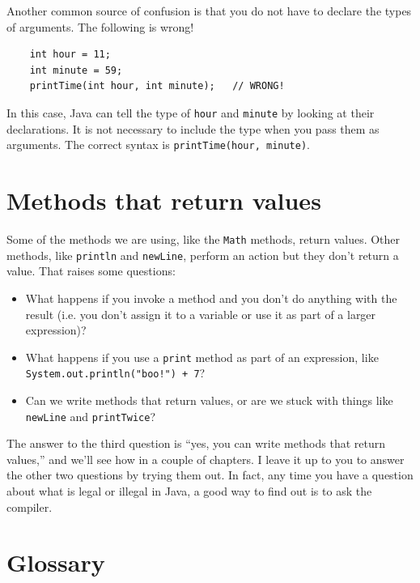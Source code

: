 \documentclass[12pt]{book}
\theoremstyle{exercise}
\begin{document}
Another common source of confusion is that you do not have
to declare the types of arguments.  The following is wrong!

\begin{lstlisting}
    int hour = 11;
    int minute = 59;
    printTime(int hour, int minute);   // WRONG!
\end{lstlisting}
%
In this case, Java can tell the type of {\tt hour}
and {\tt minute} by looking at their declarations.  It is
not necessary to include the type when you pass them
as arguments.  The correct
syntax is {\tt printTime(hour, minute)}.


\section {Methods that return values}

Some of the methods we are using,
like the {\tt Math} methods, return values.  Other methods,
like {\tt println} and {\tt newLine}, perform an action but
they don't return a value.  That raises some questions:

\begin{itemize}

\item What happens if you invoke a method and you don't
do anything with the result (i.e. you don't assign it to
a variable or use it as part of a larger expression)?

\item What happens if you use a {\tt print} method as part
of an expression, like {\tt System.out.println("boo!") + 7}?

\item Can we write methods that return values, or are we
stuck with things like {\tt newLine} and {\tt printTwice}?

\end{itemize}

The answer to the third question is ``yes, you can write methods that
return values,'' and we'll see how in a couple of chapters.  I
leave it up to you to answer the other two questions by trying them
out.  In fact, any time you have a question about what is legal or
illegal in Java, a good way to find out is to ask the compiler.


\section{Glossary}
\end{document}
